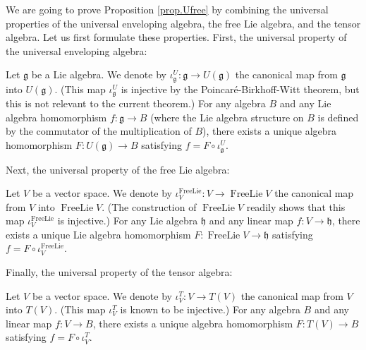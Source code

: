 \documentclass[etingof-lie.tex]{subfiles}
\begin{document}
We are going to prove Proposition \ref{prop.Ufree} by combining the universal
properties of the universal enveloping algebra, the free Lie algebra, and the
tensor algebra. Let us first formulate these properties. First, the universal
property of the universal enveloping algebra:

\begin{theorem}
\label{thm.universal.U}Let $\mathfrak{g}$ be a Lie algebra. We denote by
$\iota_{\mathfrak{g}}^{U}:\mathfrak{g}\rightarrow U\left(  \mathfrak{g}%
\right)  $ the canonical map from $\mathfrak{g}$ into $U\left(  \mathfrak{g}%
\right)  $. (This map $\iota_{\mathfrak{g}}^{U}$ is injective by the
Poincar\'{e}-Birkhoff-Witt theorem, but this is not relevant to the current
theorem.) For any algebra $B$ and any Lie algebra homomorphism $f:\mathfrak{g}%
\rightarrow B$ (where the Lie algebra structure on $B$ is defined by the
commutator of the multiplication of $B$), there exists a unique algebra
homomorphism $F:U\left(  \mathfrak{g}\right)  \rightarrow B$ satisfying
$f=F\circ\iota_{\mathfrak{g}}^{U}$.
\end{theorem}

Next, the universal property of the free Lie algebra:

\begin{theorem}
\label{thm.universal.FreeLie}Let $V$ be a vector space. We denote by
$\iota_{V}^{\operatorname*{FreeLie}}:V\rightarrow\operatorname*{FreeLie}V$ the
canonical map from $V$ into $\operatorname*{FreeLie}V$. (The construction of
$\operatorname*{FreeLie}V$ readily shows that this map $\iota_{V}%
^{\operatorname*{FreeLie}}$ is injective.) For any Lie algebra $\mathfrak{h}$
and any linear map $f:V\rightarrow\mathfrak{h}$, there exists a unique Lie
algebra homomorphism $F:\operatorname*{FreeLie}V\rightarrow\mathfrak{h}$
satisfying $f=F\circ\iota_{V}^{\operatorname*{FreeLie}}$.
\end{theorem}

Finally, the universal property of the tensor algebra:

\begin{theorem}
\label{thm.universal.tensor}Let $V$ be a vector space. We denote by $\iota
_{V}^{T}:V\rightarrow T\left(  V\right)  $ the canonical map from $V$ into
$T\left(  V\right)  $. (This map $\iota_{V}^{T}$ is known to be injective.)
For any algebra $B$ and any linear map $f:V\rightarrow B$, there exists a
unique algebra homomorphism $F:T\left(  V\right)  \rightarrow B$ satisfying
$f=F\circ\iota_{V}^{T}$.
\end{theorem}
\end{document}
